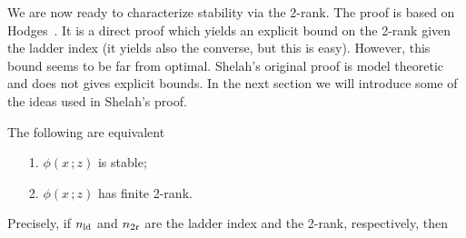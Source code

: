 \documentclass[scombinatorics.tex]{subfiles}
\begin{document}
We are now ready to characterize stability via the 2-rank.
The proof is based on Hodges~\cite{hodges}.
It is a direct proof which yields an explicit bound on the 2-rank given the ladder index (it yields also the converse, but this is easy).
However, this bound seems to be far from optimal.
Shelah's original proof is model theoretic and does not gives explicit bounds.
In the next section we will introduce some of the ideas used in Shelah's proof.

\begin{theorem}\label{thm_hodges}
  The following are equivalent
  \begin{itemize}
    \item[1.] $\phi(x\,;z)$ is stable;
    \item[2.] $\phi(x\,;z)$ has finite 2-rank.
  \end{itemize}
  Precisely, if $n_{\rm ld}$ and $n_{\rm 2r}$ are the ladder index and the 2-rank, respectively, then 
  

\end{theorem}
\end{document}
